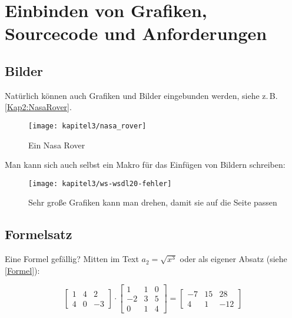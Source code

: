 \chapter{Einbinden von Grafiken, Sourcecode und Anforderungen}
\label{Kap3}

\section{Bilder}

Natürlich können auch Grafiken und Bilder eingebunden werden, siehe z.\,B. \autoref{Kap2:NasaRover}.

\begin{figure}[ht]
  \centering
  \texttt{[image: kapitel3/nasa\_rover]}
  \caption{Ein Nasa Rover}
  \label{Kap2:NasaRover}
\end{figure}

Man kann sich auch selbst ein Makro für das Einfügen von Bildern schreiben:


\begin{sidewaysfigure}
 \texttt{[image: kapitel3/ws-wsdl20-fehler]}
  \caption{Sehr große Grafiken kann man drehen, damit sie auf die Seite passen}
  \label{Kap2:wsdl-fehler}
\end{sidewaysfigure}

\clearpage %


\section{Formelsatz}

Eine Formel gefällig? Mitten im Text $a_2 = \sqrt{x^3}$ oder als eigener Absatz (siehe \autoref{Formel}):

\begin{equation}
\begin{bmatrix}
   1 &  4 &  2 \\
   4 &  0 & -3
\end{bmatrix}
        \cdot
\begin{bmatrix}
   1 &  1 &  0 \\
  -2 &  3 &  5 \\
   0 &  1 &  4
\end{bmatrix}
       {=}
\begin{bmatrix}
  -7 &  15 &  28 \\
   4 &   1 & -12
\end{bmatrix}
\label{Formel}
\end{equation}

